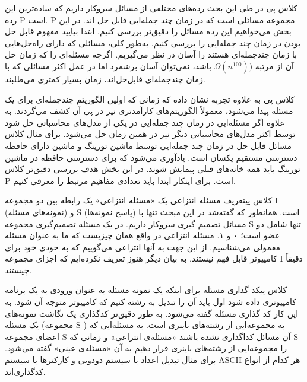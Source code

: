 \begin{itemframe}{کلاس پی}
\decLineSpace
\itm
در طی این بحث رده‌های مختلفی از مسائل سروکار داریم که ساده‌ترین این رده P است. P مجموعه مسائلی است که در زمان چند جمله‌ایی قابل حل اند. در این بخش می‌خواهیم این رده مسائل را دقیق‌تر بررسی کنیم.
\itm
ابتدا بیایید مفهوم قابل حل بودن در زمان چند جمله‌ایی را بررسی کنیم. به‌طور کلی، مسائلی که دارای راه‌حل‌هایی با زمان چندجمله‌ای هستند را آسان در نظر می‌گیریم.
\itm
اگرچه مسئله‌ای را که زمان حل آن از مرتبه
$\Omega(n^{100}))$
 باشد، نمی‌توان آسان برشمرد اما در عمل اکثر مسائلی که با زمان چندجمله‌ای قابل‌حل‌اند، زمان بسیار کمتری می‌طلبند.
\end{itemframe}

\begin{itemframe}{کلاس پی}
\itm
به علاوه تجربه نشان داده که زمانی که اولین الگوریتم چندجمله‌ای برای یک مسئله پیدا می‌شود، معمولاً الگوریتم‌های کارآمدتری نیز در پی آن کشف می‌گردند. به علاوه اگر مسئله‌ایی در زمان چند جمله‌ایی در یکی از مدل‌های محاسباتی حل شود توسط اکثر مدل‌های محاسباتی دیگر نیز در همین زمان حل می‌شود.
\itm
برای مثال کلاس مسائل قابل حل در زمان چند جمله‌ایی توسط ماشین تورینگ و ماشین دارای حافظه دسترسی مستقیم یکسان است.
‌یادآوری می‌شود که برای دسترسی حافظه در ماشین تورینگ باید همه خانه‌های قبلی پیمایش شوند.
\itm
در این بخش هدف بررسی دقیق‌تر کلاس P است. برای اینکار ابتدا باید تعدادی مفاهیم مرتبط را معرفی کنیم.
\end{itemframe}


\begin{itemframe-s}{کلاس پی}{تعریف مسئله انتزاعی}
\itm
یک «مسئله انتزاعی»
 یک رابطه بین دو مجموعه I (نمونه‌های مسئله) و S (پاسخ نمونه‌ها) است.
همانطور که گفته‌شد در این مبحث تنها با مسائل تصمیم گیری سروکار داریم.
در یک مسئله تصمیم‌گیری مجموعه S تنها شامل دو عضو است؛ ۰ و ۱.
\itm
مسئله انتزاعی در واقع همان چیزیست که ما به عنوان مسئله معمولی می‌شناسیم. از این جهت به آنها انتزاعی می‌گوییم که به خودی خود  برای کامپیوتر قابل فهم نیستند. به بیان دیگر هنوز تعریف نکرده‌ایم که اجزای مجموعه I دقیقاً چیستند.
\end{itemframe-s}

\begin{itemframe-s}{کلاس پی}{کد گذاری مسئله}
\itm
برای اینکه یک نمونه مسئله به عنوان ورودی به یک برنامه کامپیوتری داده شود اول باید آن را تبدیل به رشته کنیم که کامپیوتر متوجه آن شود.
\itm
به این کار کد گذاری
مسئله گفته می‌شود. به طور دقیق‌تر کدگذاری یک نگاشت نمونه‌های یک مسئله (مجموعه S )
به مجموعه‌ایی از رشته‌های باینری است.
\itm
به مسئله‌ایی که اعضای مجموعه S آن مسائل کداگذاری نشده باشند «مسئله‌ی انتزاعی»
و زمانی که S را مجموعه‌ایی از رشته‌های باینری قرار دهیم به آن «مسئله‌ی عینی»
گفته می‌شود.
\itm
برای مثال تبدیل اعداد با سیستم دودویی و کارکترها با سیستم ASCII هر کدام از انواع کدگذاری‌اند.
\end{itemframe-s}


